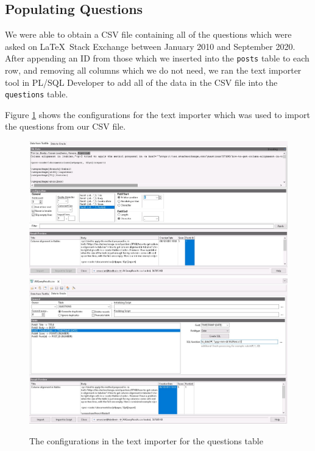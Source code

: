 \subsection{Populating Questions}

We were able to obtain a CSV file containing all of the questions which were asked on \LaTeX\ Stack Exchange between January 2010 and September 2020. After appending an ID from those which we inserted into the \verb`posts` table to each row, and removing all columns which we do not need, we ran the text importer tool in PL/SQL Developer to add all of the data in the CSV file into the \verb`questions` table.

Figure \ref{questions-text-import} shows the configurations for the text importer which was used to import the questions from our CSV file.

\begin{figure}[hbp]
	\centering
	\includegraphics[width=\linewidth]{images/questions_text_import_1.jpeg}
	\vspace{2em}
	\includegraphics[width=\linewidth]{images/questions_text_import_2.jpeg}
	\caption{The configurations in the text importer for the questions table}
	\label{questions-text-import}
\end{figure}


